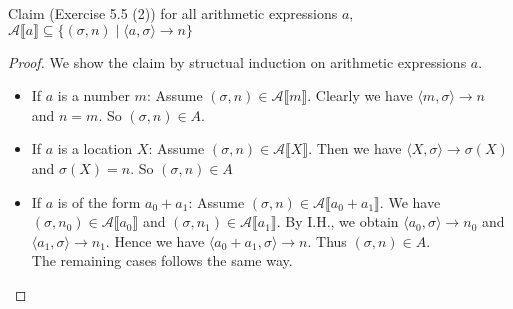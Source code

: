 \documentclass[12pt,aspectratio=169]{beamer}
\newcommand{\denoA}[1]{\mathcal{A} \llbracket #1 \rrbracket}
\newcommand{\deriv}[3]{\langle #1, #2 \rangle \rightarrow #3}
\begin{document}
\begin{frame}
    \begin{block}{Claim (Exercise 5.5 (2))}
        for all arithmetic expressions $a$, $\denoA{a} \subseteq \{(\sigma,n) \mid \deriv{a}{\sigma}{n}\}$
    \end{block}
    \begin{proof}
        We show the claim by structual induction on arithmetic expressions $a$.
        \begin{itemize}
            \item If $a$ is a number $m$: Assume $(\sigma, n) \in \denoA{m}$. Clearly we have $\deriv{m}{\sigma}{n}$
                and $n = m$. So $(\sigma,n) \in A$.
            \item If $a$ is a location $X$: Assume $(\sigma, n) \in \denoA{X}$.
                Then we have $\deriv{X}{\sigma}{\sigma(X)}$ and $\sigma(X) = n$. So $(\sigma,n) \in A$
            \item If $a$ is of the form $a_0 + a_1$: Assume $(\sigma, n) \in \denoA{a_0 + a_1}$.
                    We have $(\sigma,n_0) \in \denoA{a_0}$ and $(\sigma, n_1) \in \denoA{a_1}$.
                    By I.H., we obtain $\deriv{a_0}{\sigma}{n_0}$ and $\deriv{a_1}{\sigma}{n_1}$.
                    Hence we have $\deriv{a_0 + a_1}{\sigma}{n}$.
                    Thus $(\sigma,n) \in A$.\\
                    The remaining cases follows the same way.
        \end{itemize}
    \end{proof}
\end{frame}
\end{document}
